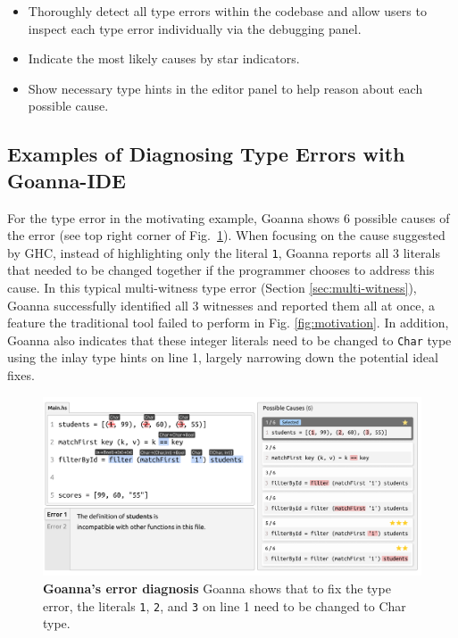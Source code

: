 \documentclass[pdflatex,lineno,sn-nature,Numbered]{sn-jnl}%
\begin{document}
    \begin{itemize}
        \item Thoroughly detect all type errors within the codebase and allow users to inspect each type error individually via the debugging panel.
        \item Indicate the most likely causes by star indicators.
        \item Show necessary type hints in the editor panel to help reason about each possible cause.
    \end{itemize}

    \subsection{Examples of Diagnosing Type Errors with Goanna-IDE}

    For the type error in the motivating example, Goanna shows 6 possible causes of the error (see top right corner of Fig.~\ref{fig:goanna-example-1}). When focusing on the cause suggested by GHC, instead of highlighting only the literal \texttt{1}, Goanna reports all 3 literals that needed to be changed together if the programmer chooses to address this cause. In this typical multi-witness type error (Section \ref{sec:multi-witness}), Goanna successfully identified all 3 witnesses and reported them all at once, a feature the traditional tool failed to perform in Fig. \ref{fig:motivation}.  In addition, Goanna also indicates that these integer literals need to be changed to \texttt{Char} type using the inlay type hints on line 1, largely narrowing down the potential ideal fixes. 

    \begin{figure}[ht!]
        \centering
        \includegraphics[width=\linewidth]{images/Goanna-Example-1.pdf}
        \caption[Goanna's showing possible causes of a type error (1)]{\textbf{Goanna's error diagnosis} Goanna shows that to fix the type error, the literals \texttt{1}, \texttt{2}, and \texttt{3} on line 1 need to be changed to Char type.}
        \label{fig:goanna-example-1}
    \end{figure}
\end{document}
